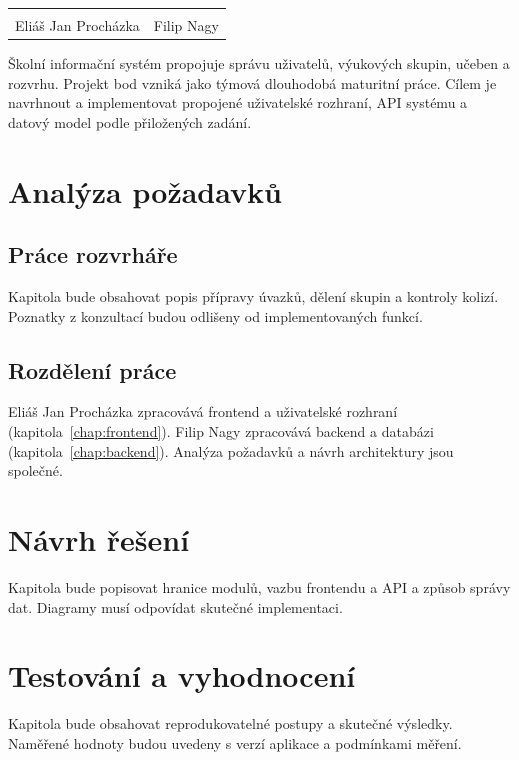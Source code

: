 \noindent\begin{tabular}{@{}p{}p{}@{}}
\dotfill & \dotfill \\
Eliáš Jan Procházka & Filip Nagy
\end{tabular}

\clearpage
\tableofcontents
\clearpage
\edef\FirstTextPage{\arabic{page}}
\setcounter{page}{\FirstTextPage}

Školní informační systém propojuje správu uživatelů, výukových skupin,
učeben a rozvrhu. Projekt bod vzniká jako týmová dlouhodobá maturitní práce.
Cílem je navrhnout a implementovat propojené uživatelské rozhraní, API
systému a datový model podle přiložených zadání.

\chapter{Analýza požadavků}
\section{Práce rozvrháře}
Kapitola bude obsahovat popis přípravy úvazků, dělení skupin a kontroly
kolizí. Poznatky z konzultací budou odlišeny od implementovaných funkcí.

\section{Rozdělení práce}
Eliáš Jan Procházka zpracovává frontend a uživatelské rozhraní
(kapitola~\ref{chap:frontend}). Filip Nagy zpracovává backend a databázi
(kapitola~\ref{chap:backend}). Analýza požadavků a návrh architektury jsou společné.

\chapter{Návrh řešení}
Kapitola bude popisovat hranice modulů, vazbu frontendu a API a způsob
správy dat. Diagramy musí odpovídat skutečné implementaci.




\chapter{Testování a vyhodnocení}
Kapitola bude obsahovat reprodukovatelné postupy a skutečné výsledky.
Naměřené hodnoty budou uvedeny s verzí aplikace a podmínkami měření.

